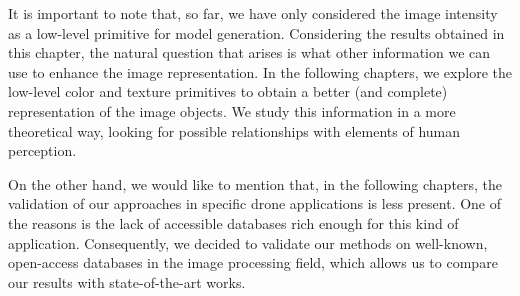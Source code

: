 It is important to note that, so far, we have only considered the image intensity as a low-level primitive for model generation. Considering the results obtained in this chapter, the natural question that arises is what other information we can use to enhance the image representation. In the following chapters, we explore the low-level color and texture primitives to obtain a better (and complete) representation of the image objects. We study this information in a more theoretical way, looking for possible relationships with elements of human perception. 

On the other hand, we would like to mention that, in the following chapters, the validation of our approaches in specific drone applications is less present. One of the reasons is the lack of accessible databases rich enough for this kind of application. Consequently, we decided to validate our methods on well-known, open-access databases in the image processing field, which allows us to compare our results with state-of-the-art works.


